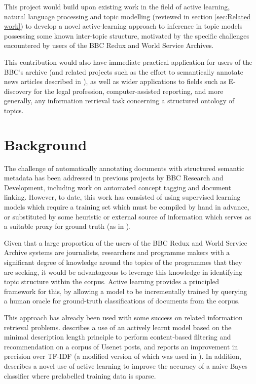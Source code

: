 \documentclass[a4paper, 11pt]{article}
\begin{document}
This project would build upon existing work in the field of active learning, natural language processing and topic modelling (reviewed in section \ref{sec:Related work}) to develop a novel active-learning approach to inference in topic models possessing some known inter-topic structure, motivated by the specific challenges encountered by users of the BBC Redux and World Service Archives.

This contribution would also have immediate practical application for users of the BBC's archive (and related projects such as the effort to semantically annotate news articles described in \cite{Shearer}), as well as wider applications to fields such as E-discovery for the legal profession, computer-assisted reporting, and more generally, any information retrieval task concerning a structured ontology of topics.

\section{Background}
\label{sec:Background}
The challenge of automatically annotating documents with structured semantic metadata has been addressed in previous projects by BBC Research and Development, including work on automated concept tagging and  document linking. However, to date, this work has consisted of using supervised learning models which require a training set which must be compiled by hand in advance, or substituted by some heuristic or external source of information which serves as a suitable proxy for ground truth (as in \cite{Raimond2012}).

Given that a large proportion of the users of the BBC Redux and World Service Archive systems are journalists, researchers and programme makers with a significant degree of knowledge around the topics of the programmes that they are seeking, it would be advantageous to leverage this knowledge in identifying topic structure within the corpus. Active learning provides a principled framework for this, by allowing a model to be incrementally trained by querying a human oracle for ground-truth classifications of documents from the corpus.

This approach has already been used with some success on related information retrieval problems. \cite{Lang1995} describes a use of an actively learnt model based on the minimal description length principle to perform content-based filtering and recommendation on a corpus of Usenet posts, and reports an improvement in precision over TF-IDF (a modified version of which was used in \cite{Raimond2012}). In addition, \cite{McCallum1998} describes a novel use of active learning to improve the accuracy of a naive Bayes classifier where prelabelled training data is sparse.
\end{document}
